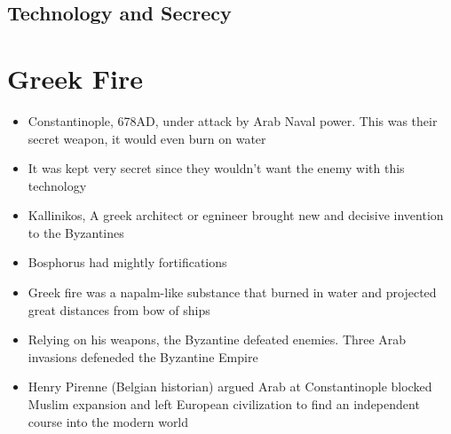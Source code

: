 \documentclass{article}
\begin{document}
\subsection{Technology and Secrecy}

\section*{Greek Fire}
\begin{itemize}
  \item Constantinople, 678AD, under attack by Arab Naval power.
    This was their secret weapon, it would even burn on water
  \item It was kept very secret since they wouldn't want the enemy with this technology
  \item Kallinikos, A greek architect or egnineer brought new and decisive invention to the Byzantines
  \item Bosphorus had mightly fortifications
  \item Greek fire was a napalm-like substance that burned in water and
    projected great distances from bow of ships
  \item Relying on his weapons, the Byzantine defeated enemies. Three Arab invasions defeneded the Byzantine Empire
  \item Henry Pirenne (Belgian historian) argued Arab at Constantinople
    blocked Muslim expansion and left European civilization to find an independent course into the modern world


\end{itemize}
\end{document}
